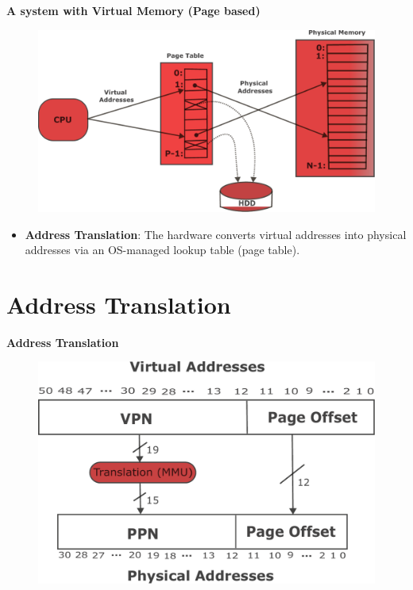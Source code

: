 \documentclass[11pt, table, aspectratio=169]{beamer}
\begin{document}
\begin{frame}{\textbf{A system with Virtual Memory (Page based)}}
	\begin{figure}
		\centering
		\includegraphics[width=0.85 \linewidth ]{pic/VM.pdf}
	\end{figure}
	\vspace{-0.35cm}
\begin{itemize}
			\item \textbf{Address Translation}: The hardware converts virtual addresses into physical addresses via an OS-managed lookup table (page table).
		\end{itemize}
\end{frame}

\section{\textbf{Address Translation}}

\begin{frame}{\textbf{Address Translation}}
	\begin{figure}
		\centering 
		\includegraphics[width=0.8 \linewidth]{pic/translation2.pdf}
	\end{figure}
\end{frame}
\end{document}
